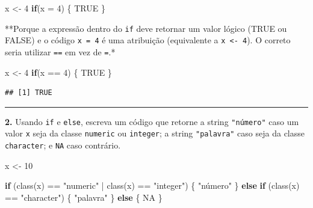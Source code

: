 \documentclass[
]{book}
\newenvironment{Shaded}{\begin{snugshade}}{\end{snugshade}}
\newcommand{\AttributeTok}[1]{\textcolor[rgb]{0.77,0.63,0.00}{#1}}
\newcommand{\ConstantTok}[1]{\textcolor[rgb]{0.00,0.00,0.00}{#1}}
\newcommand{\ControlFlowTok}[1]{\textcolor[rgb]{0.13,0.29,0.53}{\textbf{#1}}}
\newcommand{\DecValTok}[1]{\textcolor[rgb]{0.00,0.00,0.81}{#1}}
\newcommand{\FunctionTok}[1]{\textcolor[rgb]{0.00,0.00,0.00}{#1}}
\newcommand{\NormalTok}[1]{#1}
\newcommand{\OtherTok}[1]{\textcolor[rgb]{0.56,0.35,0.01}{#1}}
\newcommand{\SpecialCharTok}[1]{\textcolor[rgb]{0.00,0.00,0.00}{#1}}
\newcommand{\StringTok}[1]{\textcolor[rgb]{0.31,0.60,0.02}{#1}}
\begin{document}
\begin{Shaded}
\begin{Highlighting}[]
\NormalTok{x }\OtherTok{\textless{}{-}} \DecValTok{4}
\ControlFlowTok{if}\NormalTok{(}\AttributeTok{x =} \DecValTok{4}\NormalTok{) \{}
  \ConstantTok{TRUE}
\NormalTok{\}}
\end{Highlighting}
\end{Shaded}

**Porque a expressão dentro do \texttt{if} deve retornar um valor lógico (TRUE ou FALSE) e o código \texttt{x\ =\ 4} é uma atribuição (equivalente a \texttt{x\ \textless{}-\ 4}). O correto seria utilizar \texttt{==} em vez de \texttt{=}.*

\begin{Shaded}
\begin{Highlighting}[]
\NormalTok{x }\OtherTok{\textless{}{-}} \DecValTok{4}
\ControlFlowTok{if}\NormalTok{(x }\SpecialCharTok{==} \DecValTok{4}\NormalTok{) \{}
  \ConstantTok{TRUE}
\NormalTok{\}}
\end{Highlighting}
\end{Shaded}

\begin{verbatim}
## [1] TRUE
\end{verbatim}

\begin{center}\rule{0.5\linewidth}{0.5pt}\end{center}

\textbf{2.} Usando \texttt{if} e \texttt{else}, escreva um código que retorne a string \texttt{"número"} caso um valor \texttt{x} seja da classe \texttt{numeric} ou \texttt{integer}; a string \texttt{"palavra"} caso seja da classe \texttt{character}; e \texttt{NA} caso contrário.

\begin{Shaded}
\begin{Highlighting}[]
\NormalTok{x }\OtherTok{\textless{}{-}} \DecValTok{10}

\ControlFlowTok{if}\NormalTok{ (}\FunctionTok{class}\NormalTok{(x) }\SpecialCharTok{==} \StringTok{"numeric"} \SpecialCharTok{|} \FunctionTok{class}\NormalTok{(x) }\SpecialCharTok{==} \StringTok{"integer"}\NormalTok{) \{}
  \StringTok{"número"}
\NormalTok{\} }\ControlFlowTok{else} \ControlFlowTok{if}\NormalTok{ (}\FunctionTok{class}\NormalTok{(x) }\SpecialCharTok{==} \StringTok{"character"}\NormalTok{) \{}
  \StringTok{"palavra"}
\NormalTok{\} }\ControlFlowTok{else}\NormalTok{ \{}
  \ConstantTok{NA}
\NormalTok{\}}
\end{Highlighting}
\end{Shaded}
\end{document}
